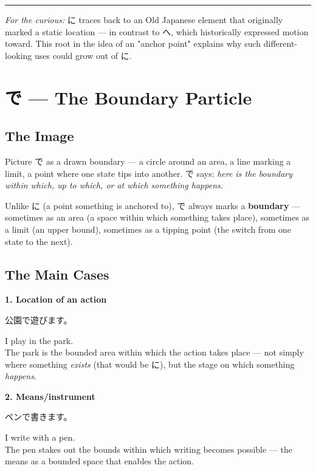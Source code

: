 \documentclass[12pt]{book}
\begin{document}
\bigskip\hrule\bigskip

\emph{For the curious:} に traces back to an Old Japanese element that originally marked a static location — in contrast to へ, which historically expressed motion toward. This root in the idea of an "anchor point" explains why such different-looking uses could grow out of に.


\chapter{で — The Boundary Particle}

\section*{The Image}

Picture で as a drawn boundary — a circle around an area, a line marking a limit, a point where one state tips into another. で says: \emph{here is the boundary within which, up to which, or at which something happens.}

Unlike に (a point something is anchored to), で always marks a \textbf{boundary} — sometimes as an area (a space within which something takes place), sometimes as a limit (an upper bound), sometimes as a tipping point (the switch from one state to the next).

\section*{The Main Cases}

\textbf{1. Location of an action}
\par\quad 公園で遊びます。\\
\par\quad I play in the park.\\

The park is the bounded area within which the action takes place — not simply where something \emph{exists} (that would be に), but the stage on which something \emph{happens}.

\textbf{2. Means/instrument}
\par\quad ペンで書きます。\\
\par\quad I write with a pen.\\

The pen stakes out the bounds within which writing becomes possible — the means as a bounded space that enables the action.
\end{document}
